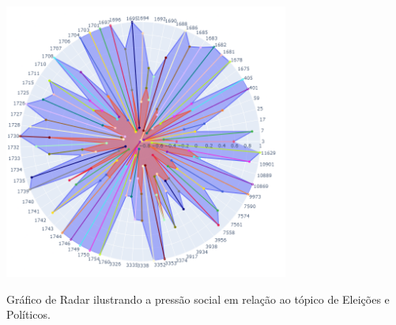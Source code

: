 \begin{quadro}[htb]
	\centering
	\includegraphics[width=0.7\textwidth]{images/social_barometer_polititians.png}
	\caption{Gráfico de Radar ilustrando a pressão social em relação ao tópico de Eleições e Políticos.}
	\label{fig:social_barometer_polititians}
\end{quadro}

